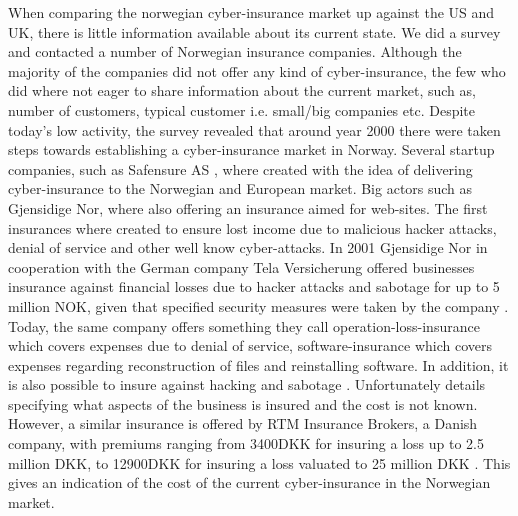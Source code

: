 When comparing the norwegian cyber-insurance market up against the US and UK, 
there is little information available about its current state. We did a survey and contacted a number of Norwegian insurance companies. Although the majority of the companies did not offer any kind of cyber-insurance, the few who did where not eager to share information about the current market, such as, number of customers, typical customer i.e. small/big companies etc.  
Despite today's low activity, the survey revealed that around year 2000 there were taken steps towards
 establishing a cyber-insurance market in Norway. Several startup companies, such as Safensure AS \cite{digi},
  where created with the idea of delivering cyber-insurance to the Norwegian and European market. Big actors such as Gjensidige Nor, where also offering an insurance aimed for web-sites. 
The first insurances where created to ensure lost income due to malicious hacker attacks, denial of service and other well know cyber-attacks. 
In 2001 Gjensidige Nor in cooperation with the German company Tela Versicherung offered businesses
 insurance against financial losses due to hacker attacks and sabotage for up to 5 million NOK, given that specified security measures were taken by the company \cite{dagensithackerforsikring}. 
 Today, the same company 
offers something they call operation-loss-insurance which covers expenses due to denial of service,
 software-insurance which covers expenses regarding reconstruction of files and reinstalling software.
 In addition, it is also possible to insure against hacking and sabotage \citep{gjensidige}. 
 Unfortunately details specifying what aspects of the business is insured and the cost is not known. However,
  a similar insurance is offered by RTM Insurance Brokers, a Danish company, with premiums ranging from 3400DKK for insuring a loss up to 2.5 million DKK, to 12900DKK for insuring a loss valuated to 25 million DKK \cite{RTM}. This gives an indication of the cost of the current cyber-insurance in the Norwegian market. 

